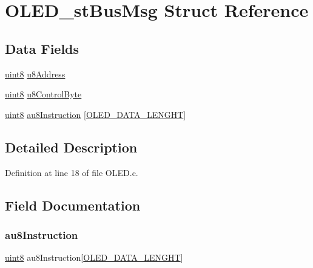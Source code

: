 \hypertarget{struct_o_l_e_d__st_bus_msg}{}\section{O\+L\+E\+D\+\_\+st\+Bus\+Msg Struct Reference}
\label{struct_o_l_e_d__st_bus_msg}
\subsection*{Data Fields}
\begin{DoxyCompactItemize}
\item 
\mbox{\hyperlink{_p_i_t_8h_adde6aaee8457bee49c2a92621fe22b79}{uint8}} \mbox{\hyperlink{struct_o_l_e_d__st_bus_msg_a932b59335d55254051885be73fae32ef}{u8\+Address}}
\item 
\mbox{\hyperlink{_p_i_t_8h_adde6aaee8457bee49c2a92621fe22b79}{uint8}} \mbox{\hyperlink{struct_o_l_e_d__st_bus_msg_a1f20ee17dfcc4c06230785e42d9a61ef}{u8\+Control\+Byte}}
\item 
\mbox{\hyperlink{_p_i_t_8h_adde6aaee8457bee49c2a92621fe22b79}{uint8}} \mbox{\hyperlink{struct_o_l_e_d__st_bus_msg_ae43dfd1ad96e4ecd22c1f938fb7e7bd5}{au8\+Instruction}} \mbox{[}\mbox{\hyperlink{_o_l_e_d_8c_a5407566ec83520087aed061f6f1dcf17}{O\+L\+E\+D\+\_\+\+D\+A\+T\+A\+\_\+\+L\+E\+N\+G\+HT}}\mbox{]}
\end{DoxyCompactItemize}


\subsection{Detailed Description}


Definition at line 18 of file O\+L\+E\+D.\+c.



\subsection{Field Documentation}
\mbox{\label{struct_o_l_e_d__st_bus_msg_ae43dfd1ad96e4ecd22c1f938fb7e7bd5}} 
\subsubsection{\texorpdfstring{au8Instruction}{au8Instruction}}
{\footnotesize\ttfamily \mbox{\hyperlink{_p_i_t_8h_adde6aaee8457bee49c2a92621fe22b79}{uint8}} au8\+Instruction\mbox{[}\mbox{\hyperlink{_o_l_e_d_8c_a5407566ec83520087aed061f6f1dcf17}{O\+L\+E\+D\+\_\+\+D\+A\+T\+A\+\_\+\+L\+E\+N\+G\+HT}}\mbox{]}}



